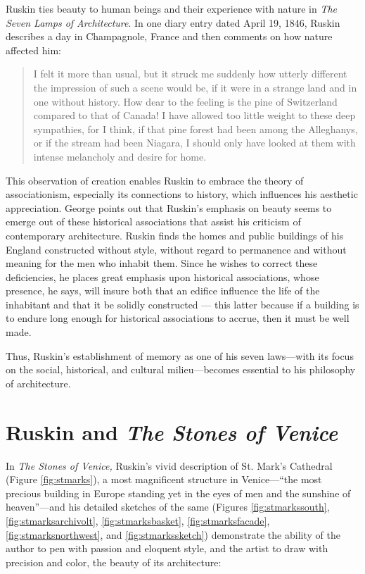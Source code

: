 Ruskin ties beauty to human beings and their experience with nature in
\textit{The Seven Lamps of Architecture}.  In one diary entry dated
April 19, 1846, Ruskin describes a day in Champagnole, France and then
comments on how nature affected him: 

\begin{quote}
I felt it more than usual, but it struck me suddenly how utterly
different the impression of such a scene would be, if it were in a
strange land and in one without history.  How dear to the feeling is
the pine of Switzerland compared to that of Canada!  I have allowed too
little weight to these deep sympathies, for I think, if that pine
forest had been among the Alleghanys, or if the stream had been
Niagara, I should only have looked at them with intense melancholy and
desire for home. \citep[][p.~325]{ruskin1956}
\end{quote}

This observation of creation enables Ruskin to embrace the theory of
associationism, especially its connections to history, which influences
his aesthetic appreciation.  George \citet{landow2005} points out that Ruskin’s
emphasis on beauty seems to emerge out of these historical associations
that assist his criticism of contemporary architecture.  Ruskin finds the homes and
public buildings of his England constructed without style, without
regard to permanence and without meaning for the men who inhabit them. 
Since he wishes to correct these deficiencies, he places great emphasis
upon historical associations, whose presence, he says, will insure both
that an edifice influence the life of the inhabitant and that it be
solidly constructed — this latter because if a building is to endure
long enough for historical associations to accrue, then it must be well
made. 

Thus, Ruskin’s establishment of memory as one of his seven laws—with its
focus on the social, historical, and cultural milieu—becomes essential
to his philosophy of architecture. 

\section{Ruskin and \textit{The Stones of Venice}}


In \textit{The Stones of Venice,} Ruskin’s vivid description of St.
Mark’s Cathedral (Figure \ref{fig:stmarks}), a most magnificent structure in Venice---“the
most precious building in Europe standing yet in the eyes of men and
the sunshine of heaven”\citep{nyt1880}---and his detailed sketches of the
same (Figures \ref{fig:stmarkssouth}, \ref{fig:stmarksarchivolt}, \ref{fig:stmarksbasket}, \ref{fig:stmarksfacade}, \ref{fig:stmarksnorthwest}, and \ref{fig:stmarkssketch}) demonstrate the ability of the author to pen with
passion and eloquent style, and the artist to draw with precision and
color, the beauty of its architecture: 

